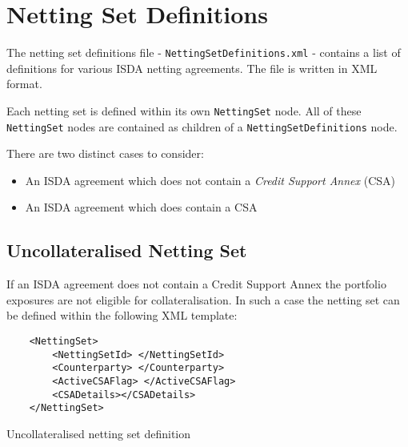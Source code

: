 \section{Netting Set Definitions}\label{sec:nettingsetinput}

The netting set definitions file - {\tt NettingSetDefinitions.xml} - 
contains a list of
definitions for various ISDA netting agreements. The file is written
in XML format. 

\vspace{1em}

Each netting set is defined within its own \lstinline!NettingSet!
node. All of these \lstinline!NettingSet! nodes are contained as
children of a \lstinline!NettingSetDefinitions! node.

\vspace{1em}

There are two distinct cases to consider:

\begin{itemize}
\item An ISDA agreement which does not contain a \emph{Credit Support
    Annex} (CSA)
\item An ISDA agreement which does contain a CSA
\end{itemize}
\subsection{Uncollateralised Netting Set}
If an ISDA agreement does not contain a Credit Support Annex the
portfolio exposures are not eligible for collateralisation. In such a
case the netting set can be defined within the following XML template:

\begin{listing}[H]
\begin{verbatim}
    <NettingSet>
        <NettingSetId> </NettingSetId>
        <Counterparty> </Counterparty>
        <ActiveCSAFlag> </ActiveCSAFlag>
        <CSADetails></CSADetails>
    </NettingSet>
\end{verbatim}
\caption{Uncollateralised netting set definition}
\label{lst:nettingSetUncollat}
\end{listing}

